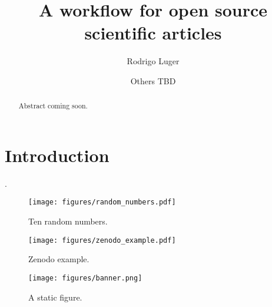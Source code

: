\documentclass[twocolumn]{aastex631}
\begin{document}
\title{A workflow for open source scientific articles}

\author[0000-0002-0296-3826]{Rodrigo Luger}
\author{Others TBD}

\begin{abstract}
    Abstract coming soon.
\end{abstract}

\section{Introduction}
\label{sec:intro}

\citet{Luger2021}.

\begin{figure}[ht!]
    \begin{centering}
        \texttt{[image: figures/random\_numbers.pdf]}
        \caption{Ten random numbers.}
        \label{fig:random_numbers}
    \end{centering}
\end{figure}

\begin{figure}[ht!]
    \begin{centering}
        \texttt{[image: figures/zenodo\_example.pdf]}
        \caption{Zenodo example.}
        \label{fig:zenodo_example}
    \end{centering}
\end{figure}

\begin{figure}[th!]
    \begin{centering}
        \texttt{[image: figures/banner.png]}
        \caption{A static figure.}
        \label{fig:banner}
    \end{centering}
\end{figure}


\end{document}
